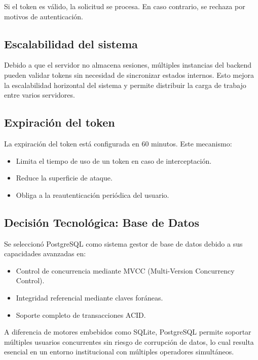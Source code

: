 \documentclass[12pt,letterpaper]{article}
\begin{document}
Si el token es válido, la solicitud se procesa. En caso contrario, se rechaza por motivos de autenticación.

\subsection*{Escalabilidad del sistema}

Debido a que el servidor no almacena sesiones, múltiples instancias del backend pueden validar tokens sin necesidad de sincronizar estados internos. Esto mejora la escalabilidad horizontal del sistema y permite distribuir la carga de trabajo entre varios servidores.

\subsection*{Expiración del token}

La expiración del token está configurada en 60 minutos. Este mecanismo:

\begin{itemize}
    \item Limita el tiempo de uso de un token en caso de interceptación.
    \item Reduce la superficie de ataque.
    \item Obliga a la reautenticación periódica del usuario.
\end{itemize}

\subsection*{Decisión Tecnológica: Base de Datos}

Se seleccionó PostgreSQL como sistema gestor de base de datos debido a sus capacidades avanzadas en:

\begin{itemize}
    \item Control de concurrencia mediante MVCC (Multi-Version Concurrency Control).
    \item Integridad referencial mediante claves foráneas.
    \item Soporte completo de transacciones ACID.
\end{itemize}

A diferencia de motores embebidos como SQLite, PostgreSQL permite soportar múltiples usuarios concurrentes sin riesgo de corrupción de datos, lo cual resulta esencial en un entorno institucional con múltiples operadores simultáneos.
\end{document}
